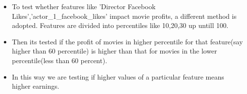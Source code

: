 \documentclass{beamer}
\begin{document}
\begin{frame}

\begin{tcolorbox}[colback=purple!5,colframe=blue!75!black,title=Testing Feature's Impact on Profit]
\begin{itemize}
\item To test whether features like 'Director Facebook Likes','actor\_1\_facebook\_likes' impact movie profits, a different method is adopted. Features are divided into percentiles like 10,20,30 up untill 100.

\item Then its tested if the profit of movies in higher percentile for that feature(say higher than 60 percentile) is higher than that for movies in the lower percentile(less than 60 percent).

\item In this way we are testing if higher values of a particular feature means higher earnings.
\end{itemize}
\end{tcolorbox}	
\end{frame}

\begin{frame}
\printbibliography

\end{frame}
\end{document}
